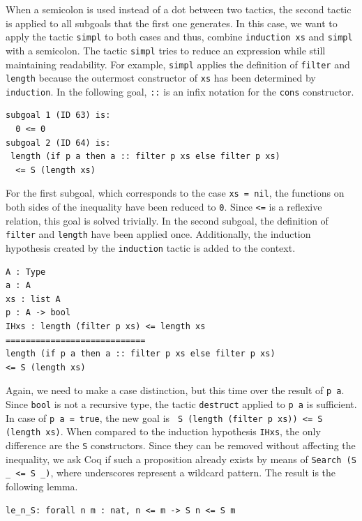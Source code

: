 \documentclass[a4paper, 11pt, fleqn, twoside, abstract=on]{scrreprt}
\newcommand{\cinl}[1]{\texttt{#1}}
\begin{document}
When a semicolon is used instead of a dot between two tactics, the second tactic is applied to all subgoals that the first one generates.
In this case, we want to apply the tactic \cinl{simpl} to both cases and thus, combine \cinl{induction xs} and \cinl{simpl} with a semicolon.
The tactic \cinl{simpl} tries to reduce an expression while still maintaining readability.
For example, \cinl{simpl} applies the definition of \cinl{filter} and \cinl{length} because the outermost constructor of \cinl{xs} has been determined by \cinl{induction}.
In the following goal, \cinl{::} is an infix notation for the \cinl{cons} constructor.

\begin{verbatim}
subgoal 1 (ID 63) is:
  0 <= 0
subgoal 2 (ID 64) is:
 length (if p a then a :: filter p xs else filter p xs) 
  <= S (length xs)
\end{verbatim}

For the first subgoal, which corresponds to the case \cinl{xs = nil}, the functions on both sides of the inequality have been reduced to \cinl{0}.
Since \cinl{<=} is a reflexive relation, this goal is solved trivially.
In the second subgoal, the definition of \cinl{filter} and \cinl{length} have been applied once.
Additionally, the induction hypothesis created by the \cinl{induction} tactic is added to the context.

\begin{verbatim}
A : Type
a : A
xs : list A
p : A -> bool
IHxs : length (filter p xs) <= length xs
============================
length (if p a then a :: filter p xs else filter p xs)
<= S (length xs)
\end{verbatim}

Again, we need to make a case distinction, but this time over the result of \cinl{p a}.
Since \cinl{bool} is not a recursive type, the tactic \cinl{destruct} applied to \cinl{p a} is sufficient.
In case of \cinl{p a = true}, the new goal is \cinl{ S (length (filter p xs)) <= S (length xs)}.
When compared to the induction hypothesis \cinl{IHxs}, the only difference are the \cinl{S} constructors.
Since they can be removed without affecting the inequality, we ask Coq if such a proposition already exists by means of \cinl{Search (S _ <= S _)}, where underscores represent a wildcard pattern.
The result is the following lemma.

\begin{verbatim}
le_n_S: forall n m : nat, n <= m -> S n <= S m
\end{verbatim}
\end{document}
